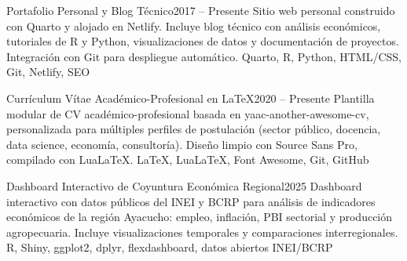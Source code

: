 

\begin{projects}
	
	
	\project
	{Portafolio Personal y Blog Técnico}{2017 -- Presente}
	{
		}
	{Sitio web personal construido con Quarto y alojado en Netlify.
		Incluye blog técnico con análisis económicos, tutoriales de R y Python,
		visualizaciones de datos y documentación de proyectos.
		Integración con Git para despliegue automático.}
	{Quarto, R, Python, HTML/CSS, Git, Netlify, SEO}
	
	\project
	{Currículum Vítae Académico-Profesional en LaTeX}{2020 -- Presente}
	{
		}
	{Plantilla modular de CV académico-profesional basada en
		yaac-another-awesome-cv, personalizada para múltiples perfiles de
		postulación (sector público, docencia, data science, economía, consultoría).
		Diseño limpio con Source Sans Pro, compilado con LuaLaTeX.}
	{LaTeX, LuaLaTeX, Font Awesome, Git, GitHub}
	
	
	\project
	{Dashboard Interactivo de Coyuntura Económica Regional}{2025}
	{
		}
	{Dashboard interactivo con datos públicos del INEI y BCRP para análisis
		de indicadores económicos de la región Ayacucho: empleo, inflación,
		PBI sectorial y producción agropecuaria. Incluye visualizaciones
		temporales y comparaciones interregionales.}
	{R, Shiny, ggplot2, dplyr, flexdashboard, datos abiertos INEI/BCRP}
	

\end{projects}

